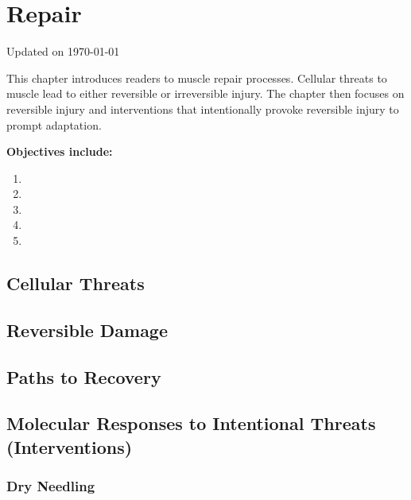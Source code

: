 \chapter{Repair}\label{chp:repair}

Updated on \today

\minitoc
This chapter introduces readers to muscle repair processes. Cellular threats to muscle lead to either reversible or irreversible injury. The chapter then focuses on reversible injury and interventions that intentionally provoke reversible injury to prompt adaptation.

\vspace{5mm}

\textbf{Objectives include:}
\begin{enumerate}
    \item
    \item
    \item
    \item
    \item
\end{enumerate}

\section{Cellular Threats}

\section{Reversible Damage}

\section{Paths to Recovery}

\section{Molecular Responses to Intentional Threats (Interventions)}

\subsection{Dry Needling}

\printbibliography[heading=subbibintoc]